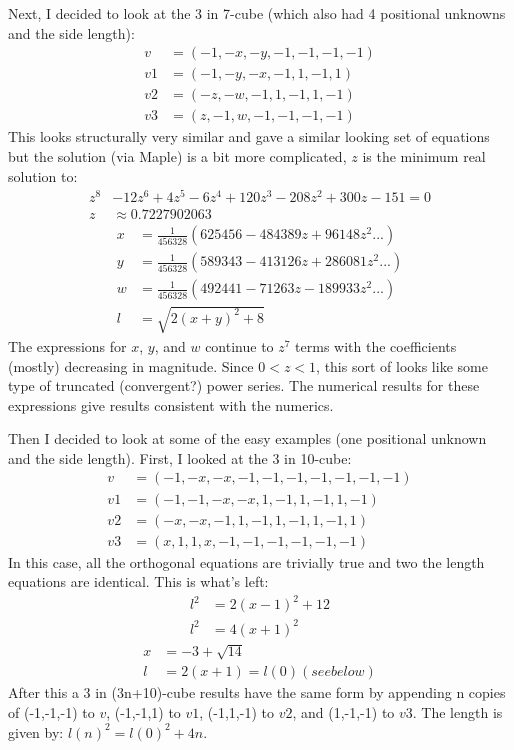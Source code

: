 \documentclass[superscriptaddress,reprint,amsmath,amssymb,aps]{revtex4-1}
\begin{document}
Next, I decided to look at the 3 in 7-cube (which also had 4 positional
unknowns and the side length):
\begin{align*}
     v  & = (-1, -x, -y, -1, -1, -1, -1) \\
     v1 & = (-1, -y, -x, -1,  1, -1,  1) \\
     v2 & = (-z, -w, -1,  1, -1,  1, -1) \\
     v3 & = ( z, -1,  w, -1, -1, -1, -1)
\end{align*}
This looks structurally very similar and gave a similar looking set of
equations but the solution (via Maple) is a bit more complicated, $z$ is
the minimum real solution to:
\begin{align*}
          z^8 & - 12z^6 + 4z^5 - 6z^4 + 120z^3 - 208z^2 + 300z - 151 = 0 \\
          z & \approx 0.7227902063
\end{align*}
\begin{align*}
     x & = \frac{1}{456328} (625456 - 484389z +  96148z^2 ...) \\
     y & = \frac{1}{456328} (589343 - 413126z + 286081z^2 ...) \\
     w & = \frac{1}{456328} (492441 -  71263z - 189933z^2 ...) \\
     l & = \sqrt{2(x+y)^2 + 8}
\end{align*}
The expressions for $x$, $y$, and $w$ continue to $z^7$ terms with the
coefficients (mostly) decreasing in magnitude.  Since $0 < z < 1$, this
sort of looks like some type of truncated (convergent?) power series.
The numerical results for these expressions give results consistent with
the numerics.

Then I decided to look at some of the easy examples (one positional
unknown and the side length).  First, I looked at the 3 in 10-cube:
\begin{align*}
     v  & = (-1, -x, -x, -1, -1, -1, -1, -1, -1, -1) \\
     v1 & = (-1, -1, -x, -x,  1, -1,  1, -1,  1, -1) \\
     v2 & = (-x, -x, -1,  1, -1,  1, -1,  1, -1,  1) \\
     v3 & = ( x,  1,  1,  x, -1, -1, -1, -1, -1, -1)
\end{align*}
In this case, all the orthogonal equations are trivially true and two
the length equations are identical.  This is what's left:
\begin{align*}
     l^2 & = 2(x-1)^2 + 12 \\
     l^2 & = 4(x+1)^2
\end{align*}
\begin{align*}
     x & = -3 + \sqrt{14}            \\
     l & = 2(x+1) = l(0) (see below)
\end{align*}
After this a 3 in (3n+10)-cube results have the same form by appending n
copies of (-1,-1,-1) to $v$, (-1,-1,1) to $v1$, (-1,1,-1) to $v2$, and
(1,-1,-1) to $v3$.  The length is given by:  $l(n)^2 = l(0)^2 + 4n$.
\end{document}
